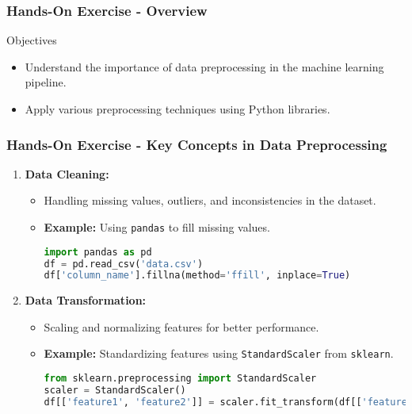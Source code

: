 \documentclass{beamer}
\begin{document}
\begin{frame}[fragile]
    \frametitle{Hands-On Exercise - Overview}
    \begin{block}{Objectives}
        \begin{itemize}
            \item Understand the importance of data preprocessing in the machine learning pipeline.
            \item Apply various preprocessing techniques using Python libraries.
        \end{itemize}
    \end{block}
\end{frame}

\begin{frame}[fragile]
    \frametitle{Hands-On Exercise - Key Concepts in Data Preprocessing}
    \begin{enumerate}
        \item \textbf{Data Cleaning:}
            \begin{itemize}
                \item Handling missing values, outliers, and inconsistencies in the dataset.
                \item \textbf{Example:} Using \texttt{pandas} to fill missing values.
                \begin{lstlisting}[language=Python]
import pandas as pd
df = pd.read_csv('data.csv')
df['column_name'].fillna(method='ffill', inplace=True)
                \end{lstlisting}
            \end{itemize}
        
        \item \textbf{Data Transformation:}
            \begin{itemize}
                \item Scaling and normalizing features for better performance.
                \item \textbf{Example:} Standardizing features using \texttt{StandardScaler} from \texttt{sklearn}.
                \begin{lstlisting}[language=Python]
from sklearn.preprocessing import StandardScaler
scaler = StandardScaler()
df[['feature1', 'feature2']] = scaler.fit_transform(df[['feature1', 'feature2']])
                \end{lstlisting}
            \end{itemize}
        

\end{enumerate}
\end{frame}
\end{document}
